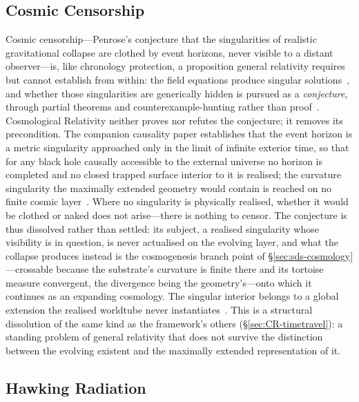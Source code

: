 \documentclass[11pt,a4paper]{article}
\theoremstyle{plain}
\theoremstyle{definition}
\theoremstyle{remark}
\begin{document}
\subsection{Cosmic Censorship}\label{sec:CR-censorship}

Cosmic censorship---Penrose's conjecture that the singularities of realistic gravitational collapse are clothed by event horizons, never visible to a distant observer---is, like chronology protection, a proposition general relativity requires but cannot establish from within: the field equations produce singular solutions~\cite{Penrose1965}, and whether those singularities are generically hidden is pursued as a \emph{conjecture}, through partial theorems and counterexample-hunting rather than proof~\cite{Penrose1969}. Cosmological Relativity neither proves nor refutes the conjecture; it removes its precondition. The companion causality paper establishes that the event horizon is a metric singularity approached only in the limit of infinite exterior time, so that for any black hole causally accessible to the external universe no horizon is completed and no closed trapped surface interior to it is realised; the curvature singularity the maximally extended geometry would contain is reached on no finite cosmic layer~\cite{JanzenBHcausality}. Where no singularity is physically realised, whether it would be clothed or naked does not arise---there is nothing to censor. The conjecture is thus dissolved rather than settled: its subject, a realised singularity whose visibility is in question, is never actualised on the evolving layer, and what the collapse produces instead is the cosmogenesis branch point of \S\ref{sec:sds-cosmology}---crossable because the substrate's curvature is finite there and its tortoise measure convergent, the divergence being the geometry's---onto which it continues as an expanding cosmology. The singular interior belongs to a global extension the realised worldtube never instantiates~\cite{JanzenBHcausality,JanzenCircle}. This is a structural dissolution of the same kind as the framework's others (\S\ref{sec:CR-timetravel}): a standing problem of general relativity that does not survive the distinction between the evolving existent and the maximally extended representation of it.

\subsection{Hawking Radiation}\label{sec:CR-hawking}
\end{document}
